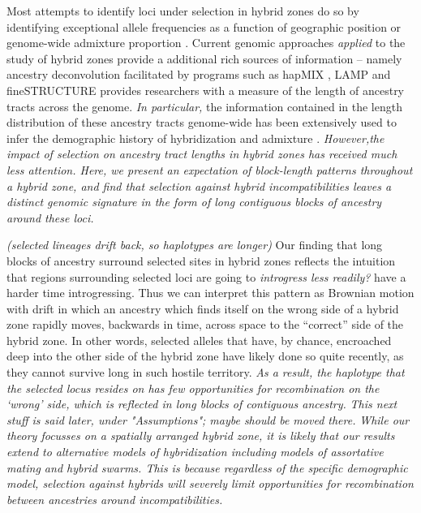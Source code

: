\documentclass[11pt,letterpaper]{article}
\newcommand{\alisa}[1]{{\em \color{red} #1}}
\newcommand{\plr}[1]{{\em \color{blue} #1}}
\newcommand{\yb}[1]{{\em \color{magenta} #1}}
\begin{document}
Most attempts to identify loci under selection in hybrid zones do so by identifying exceptional allele frequencies as a function of geographic position or genome-wide admixture proportion \citep{Porter1997,Gompert2012}.  
Current genomic approaches \alisa{applied} to the study of hybrid zones provide a additional rich sources of information -- namely ancestry deconvolution facilitated by programs such as hapMIX \citep{Price2009}, LAMP \citep{Sankararaman2008} and fineSTRUCTURE \citep{Lawson2012} provides researchers with a measure of the length of ancestry tracts across the genome.  \alisa{In particular,} the information contained in the length distribution of these ancestry tracts genome-wide  has been extensively used to infer the demographic history of hybridization and admixture \citep[e.g. ][]{Hellenthal2014}.  \alisa{However,the impact of selection on ancestry tract lengths in hybrid zones has received much less attention. Here, we present an expectation of block-length patterns throughout a hybrid zone, and find that selection against hybrid incompatibilities leaves a distinct genomic signature in the form of long contiguous blocks of ancestry around these loci.} 


\plr{(selected lineages drift back, so haplotypes are longer)}
Our finding that long blocks of ancestry surround selected sites in hybrid zones reflects the intuition that regions surrounding selected loci are going to \alisa{introgress less readily?} have a harder time introgressing. 
Thus we can interpret this pattern as Brownian motion with drift in which an ancestry which finds itself on the wrong side of a hybrid zone rapidly moves, backwards in time, across space to the ``correct'' side of the hybrid zone.  In other words, selected alleles that have, by chance, encroached deep into the other side of the hybrid zone have likely done so quite recently, as they cannot survive long in such hostile territory.  
\alisa{As a result, the haplotype that the selected locus resides on has few opportunities for recombination on the `wrong' side, which is reflected in long blocks of contiguous ancestry.}
\plr{This next stuff is said later, under "Assumptions"; maybe should be moved there.}
\yb{While our theory focusses on a spatially arranged hybrid zone, it is likely that our results extend to alternative models of hybridization including models of assortative mating and hybrid swarms. This is because regardless of the specific demographic model, selection against hybrids will severely limit opportunities for recombination between ancestries around incompatibilities.}
\end{document}
